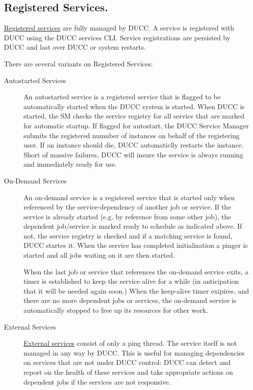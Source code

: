       \subsection{Registered Services.} \hyperref[sec:cli.ducc-services]{Registered services} are
      fully managed by DUCC. A service is registered with DUCC using the DUCC services CLI. Service
      registrations are persisted by DUCC and last over DUCC or system restarts.

      There are several variants on Registered Services:
      \begin{description}

        \item[Autostarted Services] An autostarted service is a registered service that is flagged to be
          automatically started when the DUCC system is started. When DUCC is started, the SM checks the
          service registry for all service that are marked for automatic startup.  If flagged for autostart,
          the DUCC Service Manager submits the registered numuber of instances
          on behalf of the registering user.  If an instance should die, DUCC automaticlly restarts
          the instance.  Short of massive failures, DUCC will insure the service is always running
          and immediately ready for use.
          
        \item[On-Demand Services] An on-demand service is a registered service that is started only
          when referenced by the service-dependency of another job or service. If the service is
          already started (e.g. by reference from some other job), the dependent job/service is
          marked ready to schedule as indicated above. If not, the service registry is checked and
          if a matching service is found, DUCC startes it. When the service has completed
          initialization a pinger is started and all jobs waiting on it are then started.
          
          When the last job or service that references the on-demand service exits, a timer is
          established to keep the service alive for a while (in anticipation that it will be needed
          again soon.)  When the keep-alive timer exipires, and there are no more dependent
          jobs or services, the on-demand service is automatically stopped to free up its resources for
          other work.

        \item[External Services] \hyperref[sec:services.external]{External services} consist of only
          a ping thread.  The service itself is not managed in any way by DUCC.  This is useful for
          managing dependencies on services that are not under DUCC control: DUCC can detect and
          report on the health of these services and take appropriate actions on dependent jobs if
          the services are not responsive.
      \end{description}
          
